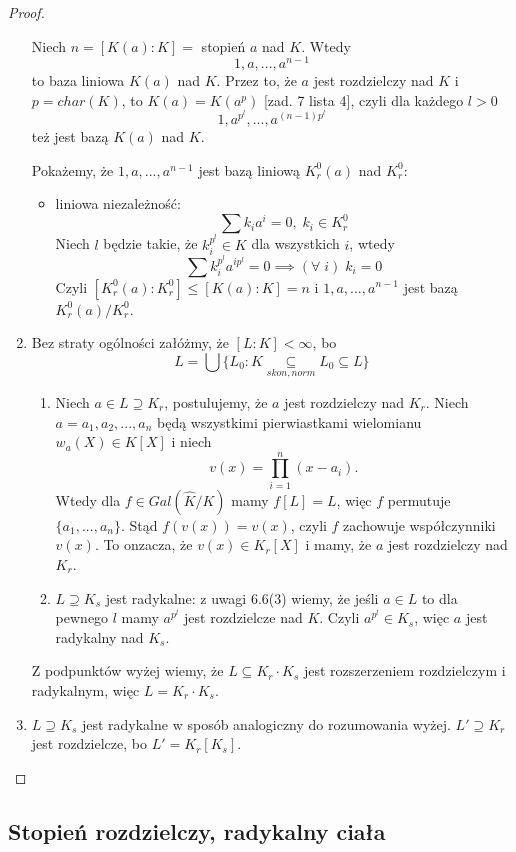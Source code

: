 \begin{proof}
\begin{enumerate}[leftmargin=*]
    Niech $n=[K(a):K]=$ stopień $a$ nad $K$. Wtedy
    $$1,a,...,a^{n-1}$$
    to baza liniowa $K(a)$ nad $K$. Przez to, że $a$ jest rozdzielczy nad $K$ i $p=char(K)$, to $K(a)=K(a^p)$ [zad. 7 lista 4], czyli dla każdego $l>0$
    $$1,a^{p^l},...,a^{(n-1)p^l}$$
    też jest bazą $K(a)$ nad $K$.

    Pokażemy, że $1,a,...,a^{n-1}$ jest bazą liniową $K_r^0(a)$ nad $K_r^0$:
    \begin{itemize}
        \item liniowa niezależność:
        $$\sum k_ia^i=0,\;k_i\in K_r^0$$
        Niech $l$ będzie takie, że $k_i^{p^l}\in K$ dla wszystkich $i$, wtedy
        $$\sum k_i^{p^l}a^{ip^l}=0\implies (\forall\;i)\;k_i=0$$
        Czyli $[K_r^0(a):K_r^0]\leq[K(a):K]=n$ i $1,a,...,a^{n-1}$ jest bazą $K_r^0(a)/K_r^0$.
    \end{itemize}
    \item Bez straty ogólności załóżmy, że $[L:K]<\infty$, bo 
    $$L=\bigcup\{L_0:K\underset{skon,norm}{\subseteq} L_0\subseteq L\}$$
    \begin{enumerate}
        \item Niech $a\in L\supseteq K_r$, postulujemy, że $a$ jest rozdzielczy nad $K_r$. Niech $a=a_1,a_2,...,a_n$ będą wszystkimi pierwiastkami wielomianu $w_a(X)\in K[X]$ i niech 
        $$v(x)=\prod\limits_{i=1}^n(x-a_i).$$
        Wtedy dla $f\in Gal(\hat{K}/K)$ mamy $f[L]=L$, więc $f$ permutuje $\{a_1,...,a_n\}$. Stąd $f(v(x))=v(x)$, czyli $f$ zachowuje współczynniki $v(x)$. To onzacza, że $v(x)\in K_r[X]$ i mamy, że $a$ jest rozdzielczy nad $K_r$.
        \item $L\supseteq K_s$ jest radykalne: z uwagi 6.6(3) wiemy, że jeśli $a\in L$ to dla pewnego $l$ mamy $a^{p^l}$ jest rozdzielcze nad $K$. Czyli $a^{p^l}\in K_s$, więc $a$ jest radykalny nad $K_s$.
    \end{enumerate}

    Z podpunktów wyżej  wiemy, że $L\subseteq K_r\cdot K_s$ jest rozszerzeniem rozdzielczym i radykalnym, więc $L=K_r\cdot K_s$.
    \item $L\supseteq K_s$ jest radykalne w sposób analogiczny do rozumowania wyżej. $L'\supseteq K_r$ jest rozdzielcze, bo $L'=K_r[K_s]$.
\end{enumerate}
\end{proof}

\subsection{Stopień rozdzielczy, radykalny ciała}

